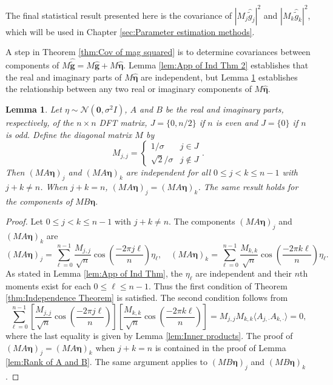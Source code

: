 \documentclass[12pt]{book}
\newcommand{\gVec}{\mathbf{g}}	%
\newcommand{\gnoise}{\widetilde{g}}	%
\newcommand{\gnoiseVec}{\widetilde{\mathbf{g}}}	%
\newcommand{\noise}{\eta}	%
\newcommand{\noiseSD}{\sigma}	%
\newcommand{\noiseVec}{\bm{\noise}}	%
\newtheorem{lemma}{Lemma}[section]
\begin{document}
The final statistical result presented here is the covariance of $|M_j\widehat{\gnoise}_j|^2$ and $|M_k\widehat{\gnoise}_k|^2$, which will be used in Chapter \ref{sec:Parameter estimation methods}.  

A step in Theorem \ref{thm:Cov of mag squared} is to determine covariances between components of $M\widehat{\gnoiseVec} = M\widehat{\gVec} + M\widehat{\noiseVec}$. Lemma \ref{lem:App of Ind Thm 2} establishes that the real and imaginary parts of $M\widehat{\noiseVec}$ are independent, but Lemma \ref{lem:App of Ind Thm 3} establishes the relationship between any two real or imaginary components of $M\widehat{\noiseVec}$.

\begin{lemma}
\label{lem:App of Ind Thm 3}
Let $\noise \sim \mathcal{N}(\bm{0},\noiseSD^2 I)$, $A$ and $B$ be the real and imaginary parts, respectively, of the $n \times n$ DFT matrix, $J = \{0,n/2\}$ if $n$ is even and $J = \{0\}$ if $n$ is odd. Define the diagonal matrix $M$ by
\[M_{j,j} = \begin{cases}
1/\noiseSD & j \in J \\
\sqrt{2}/\noiseSD & j \not\in J
\end{cases}.\]
Then $(MA\noiseVec)_j$ and $(MA\noiseVec)_k$ are independent for all $0 \leq j < k \leq n-1$ with $j + k \neq n$. When $j + k = n$, $(MA\noiseVec)_j = (MA\noiseVec)_k$. The same result holds for the components of $MB\noiseVec$.
\end{lemma}
\begin{proof}
Let $0 \leq j < k \leq n-1$ with $j + k \neq n$. The components $(MA\noiseVec)_j$ and $(MA\noiseVec)_k$ are
\[(MA\noiseVec)_j = \sum_{\ell=0}^{n-1} \frac{M_{j,j}}{\sqrt{n}}\cos\left(\frac{-2\pi{j\ell}}{n}\right)\noise_{\ell}, \quad (MA\noiseVec)_k = \sum_{\ell=0}^{n-1} \frac{M_{k,k}}{\sqrt{n}}\cos\left(\frac{-2\pi{k\ell}}{n}\right)\noise_{\ell}.\]
As stated in Lemma \ref{lem:App of Ind Thm}, the $\noise_\ell$ are independent and their $n$th moments exist for each $0 \leq \ell \leq n-1$. Thus the first condition of Theorem \ref{thm:Independence Theorem} is satisfied. The second condition follows from
\[\sum_{\ell=0}^{n-1} \left[\frac{M_{j,j}}{\sqrt{n}}\cos\left(\frac{-2\pi{j\ell}}{n}\right)\right]\left[\frac{M_{k,k}}{\sqrt{n}}\cos\left(\frac{-2\pi{k\ell}}{n}\right)\right] = M_{j,j}M_{k,k} \langle A_{j,\cdot}A_{k,\cdot} \rangle = 0,\]
where the last equality is given by Lemma \ref{lem:Inner products}. The proof of $(MA\noiseVec)_j = (MA\noiseVec)_k$ when $j+k = n$ is contained in the proof of Lemma \ref{lem:Rank of A and B}. The same argument applies to $(MB\noiseVec)_j$ and $(MB\noiseVec)_k$.
\end{proof}
\end{document}
